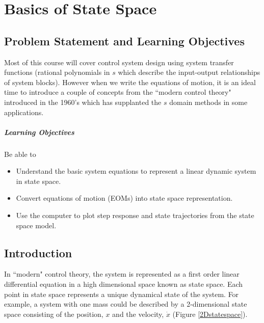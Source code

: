 

\chapter{Basics of State Space}\label{BasicsStateSpaceChapter}


\section{Problem Statement and Learning Objectives}

Most of this course will cover control system design using system transfer functions (rational polynomials in $s$ which describe the input-output relationships of system blocks).  However when we write the equations of motion, it is an ideal time to introduce a couple of concepts from the ``modern control theory" introduced in the 1960's which has supplanted the $s$ domain methods in some applications.

\paragraph{Learning Objectives}
Be able to
\begin{itemize}
    \item Understand the basic system equations to represent a linear
    dynamic system in state space.
    \item Convert equations of motion (EOMs) into state space
    representation.
    \item Use the computer to plot step response and state trajectories from
    the state space model.
\end{itemize}

\section{Introduction}
In ``modern" control theory, the system is represented as a first order linear differential equation in a high dimensional space known as state space.  Each point in state space represents a unique dynamical state of the system.   For example, a system with one mass could be described by a 2-dimensional state space consisting of the position, $x$ and the velocity, $\dot{x}$ (Figure \ref{2Dstatespace}).

